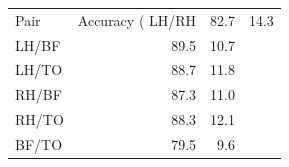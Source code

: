 \begin{tabular}{lrr}
\toprule
Pair & Accuracy (%
\midrule
LH/RH & 82.7 & 14.3 \\
LH/BF & 89.5 & 10.7 \\
LH/TO & 88.7 & 11.8 \\
RH/BF & 87.3 & 11.0 \\
RH/TO & 88.3 & 12.1 \\
BF/TO & 79.5 & 9.6 \\
\bottomrule
\end{tabular}
